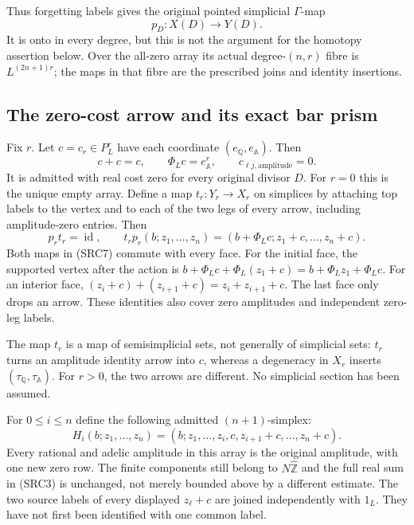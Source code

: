 Thus forgetting labels gives the original pointed simplicial
$\Gamma$-map
\begin{equation}\tag{SRC5}
p_D:X(D)\longrightarrow Y(D).
\end{equation}
It is onto in every degree, but this is not the argument for the
homotopy assertion below. Over the all-zero array its actual
degree-$(n,r)$ fibre is $L^{(2n+1)r}$; the maps in that fibre are
the prescribed joins and identity insertions.

\subsection{The zero-cost arrow and its exact bar prism}

Fix $r$. Let $c=c_r\in P_L^r$ have each coordinate
$(e_{\mathbb Q},e_{\mathbb A})$. Then
\begin{equation}\tag{SRC6}
c+c=c,\qquad \Phi_Lc=e_{\mathbb A}^r,\qquad
c_{\ell j,\mathrm{amplitude}}=0.
\end{equation}
It is admitted with real cost zero for every original divisor $D$.
For $r=0$ this is the unique empty array.
Define a map $t_r:Y_r\to X_r$ on simplices by attaching top labels
to the vertex and to each of the two legs of every arrow, including
amplitude-zero entries. Then
\begin{equation}\tag{SRC7}
p_rt_r=\operatorname{id},\qquad
t_rp_r(b;z_1,\ldots,z_n)
 =(b+\Phi_Lc;z_1+c,\ldots,z_n+c).
\end{equation}
Both maps in (SRC7) commute with every face. For the initial face,
the supported vertex after the action is
$b+\Phi_Lc+\Phi_L(z_1+c)=b+\Phi_Lz_1+\Phi_Lc$.
For an interior face, $(z_i+c)+(z_{i+1}+c)=z_i+z_{i+1}+c$.
The last face only drops an arrow. These identities also cover
zero amplitudes and independent zero-leg labels.

The map $t_r$ is a map of semisimplicial sets, not generally of
simplicial sets: $t_r$ turns an amplitude identity arrow into $c$,
whereas a degeneracy in $X_r$ inserts
$(\tau_{\mathbb Q},\tau_{\mathbb A})$. For $r>0$, the two arrows
are different. No simplicial section has been assumed.

For $0\le i\le n$ define the following admitted $(n+1)$-simplex:
\begin{equation}\tag{SRC8}
H_i(b;z_1,\ldots,z_n)
 =(b;z_1,\ldots,z_i,c,z_{i+1}+c,\ldots,z_n+c).
\end{equation}
Every rational and adelic amplitude in this array is the original
amplitude, with one new zero row. The finite components still belong
to $N\widehat{\mathbb Z}$ and the full real sum in (SRC3) is unchanged,
not merely bounded above by a different estimate. The two source
labels of every displayed $z_\ell+c$ are joined independently with
$1_L$. They have not first been identified with one common label.

